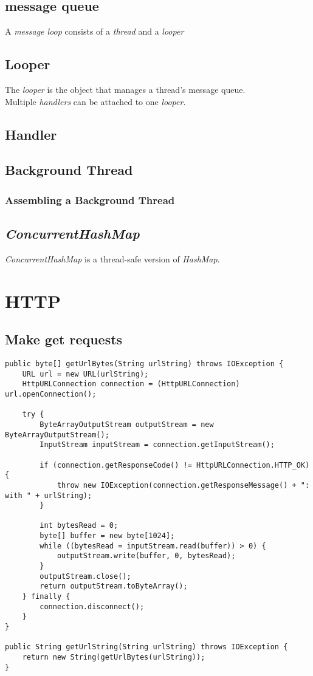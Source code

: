 \documentclass[]{article}
\renewcommand{\it}[1]{\textit{#1}}
\begin{document}
\subsection{message queue}
A \it{message loop} consists of a \it{thread} and a \it{looper}

\subsection{Looper}
The \it{looper} is the object that manages a thread's message queue.
\\
Multiple \it{handlers}  can be attached to one \it{looper}.	

\subsection{Handler}

\subsection{Background Thread}
\subsubsection{Assembling a Background Thread}

\subsection{\it{ConcurrentHashMap}}
\it{ConcurrentHashMap} is a thread-safe version of \it{HashMap}.


\section{HTTP}
\subsection{Make get requests}
\begin{lstlisting}
public byte[] getUrlBytes(String urlString) throws IOException {
	URL url = new URL(urlString);
	HttpURLConnection connection = (HttpURLConnection) url.openConnection();

	try {
		ByteArrayOutputStream outputStream = new ByteArrayOutputStream();
		InputStream inputStream = connection.getInputStream();

		if (connection.getResponseCode() != HttpURLConnection.HTTP_OK) {
			throw new IOException(connection.getResponseMessage() + ": with " + urlString);
		}

		int bytesRead = 0;
		byte[] buffer = new byte[1024];
		while ((bytesRead = inputStream.read(buffer)) > 0) {
			outputStream.write(buffer, 0, bytesRead);
		}
		outputStream.close();
		return outputStream.toByteArray();
	} finally {
		connection.disconnect();
	}
}

public String getUrlString(String urlString) throws IOException {
	return new String(getUrlBytes(urlString));
}
\end{lstlisting}
\end{document}

